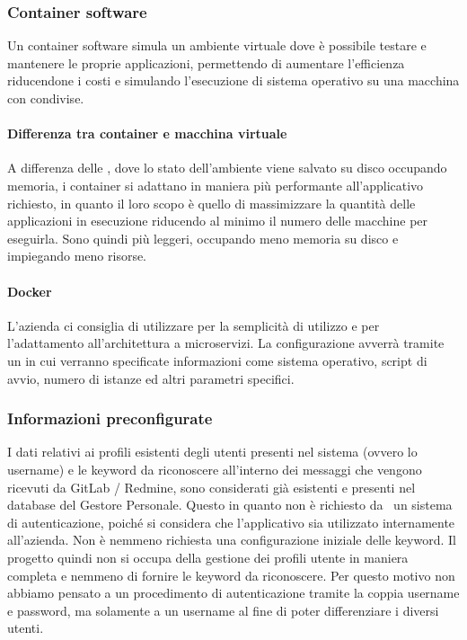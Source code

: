 	\subsubsection{Container software}
	
	Un container software simula un ambiente virtuale dove è possibile testare e mantenere le proprie applicazioni, permettendo di aumentare l'efficienza riducendone i costi e simulando l'esecuzione di sistema operativo su una macchina con  condivise.
		
		\paragraph{Differenza tra container e macchina virtuale}
		A differenza delle , dove lo stato dell'ambiente viene salvato su disco occupando memoria, i container si adattano in maniera più performante all'applicativo richiesto, in quanto il loro scopo è quello di massimizzare la quantità delle applicazioni in esecuzione riducendo al minimo il numero delle macchine per eseguirla.
		Sono quindi più leggeri, occupando meno memoria su disco e impiegando meno risorse.
		
		\paragraph{Docker}
		L'azienda ci consiglia di utilizzare  per la semplicità di utilizzo e per l'adattamento all'architettura a microservizi.
		La configurazione avverrà tramite un  in cui verranno specificate informazioni come sistema operativo, script di avvio, numero di istanze ed altri parametri specifici.

	\subsubsection{Informazioni preconfigurate}
	I dati relativi ai profili esistenti degli utenti presenti nel sistema (ovvero lo username) e le keyword da riconoscere all'interno dei messaggi che vengono ricevuti da GitLab / Redmine, sono considerati già esistenti e presenti nel database del Gestore Personale.
	Questo in quanto non è richiesto da \II\ un sistema di autenticazione, poiché si considera che l'applicativo sia utilizzato internamente all'azienda.
	Non è nemmeno richiesta una configurazione iniziale delle keyword.
	Il progetto quindi non si occupa della gestione dei profili utente in maniera completa e nemmeno di fornire le keyword da riconoscere.
	Per questo motivo non abbiamo pensato a un procedimento di autenticazione tramite la coppia username e password, ma solamente a un username al fine di poter differenziare i diversi utenti.